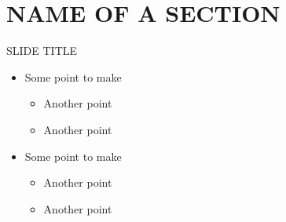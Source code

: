 \section{NAME OF A SECTION}\label{name-of-a-section}

\begin{frame}{SLIDE TITLE}

\begin{itemize}
\tightlist
\item
  Some point to make

  \begin{itemize}
  \tightlist
  \item
    Another point
  \item
    Another point
  \end{itemize}
\item
  Some point to make

  \begin{itemize}
  \tightlist
  \item
    Another point
  \item
    Another point
  \end{itemize}
\end{itemize}

\end{frame}
